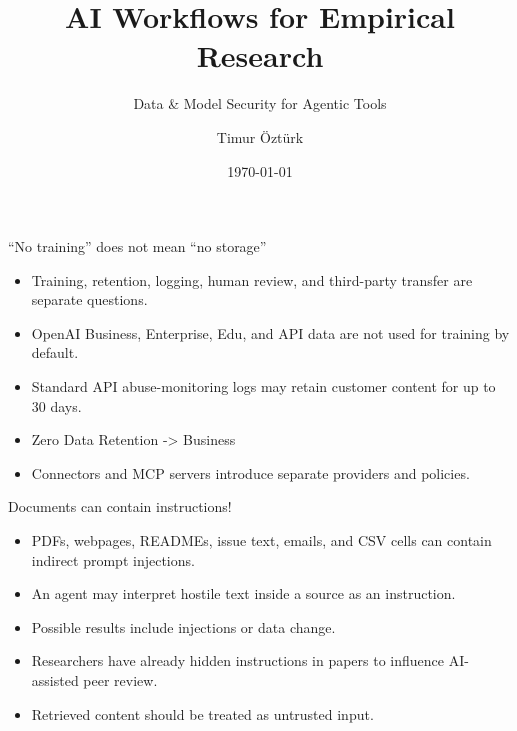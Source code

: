 \documentclass[10pt]{beamer}
\title{AI Workflows for Empirical Research}
\subtitle{Data \& Model Security for Agentic Tools}
\author{Timur Öztürk}
\institute{University of Bayreuth}
\date{\today}
\begin{document}
\begin{frame}
  \titlepage
\end{frame}

\begin{frame}{``No training'' does not mean ``no storage''}
  \begin{itemize}
    \item Training, retention, logging, human review, and third-party transfer
          are separate questions.
    \item OpenAI Business, Enterprise, Edu, and API data are not used for
          training by default.
    \item Standard API abuse-monitoring logs may retain customer content for
          up to 30 days.
    \item Zero Data Retention -> Business
    \item Connectors and MCP servers introduce separate providers and policies.
  \end{itemize}
  \vfill
  \href{https://developers.openai.com/api/docs/guides/your-data}{}\quad
  \href{https://openai.com/enterprise-privacy/}{}
\end{frame}

\begin{frame}{Documents can contain instructions!}
  \begin{itemize}
    \item PDFs, webpages, READMEs, issue text, emails, and CSV cells can contain
          indirect prompt injections.
    \item An agent may interpret hostile text inside a source as an instruction.
    \item Possible results include injections or data change.
    \item Researchers have already hidden instructions in papers to influence
          AI-assisted peer review.
    \item Retrieved content should be treated as untrusted input.
  \end{itemize}
  \vfill
  \href{https://www.nature.com/articles/d41586-025-02172-y}{}\quad
  \href{https://research-and-innovation.ec.europa.eu/news/all-research-and-innovation-news/updated-era-living-guidelines-responsible-use-generative-ai-research-2026-05-08_en}{}
\end{frame}
\end{document}

